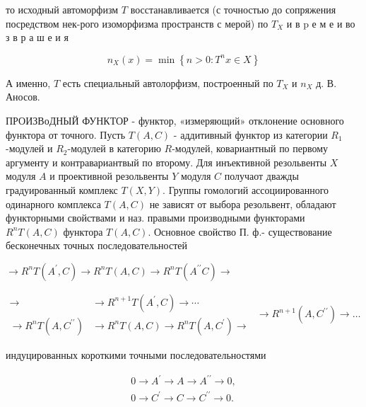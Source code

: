 \documentclass[10pt]{article}
\begin{document}
то исходный автоморфизм $T$ восстанавливается (с точностью до сопряжения посредством нек-рого изоморфизма пространств с мерой) по $T_{X}$ и в $\mathrm{p}$ е м е и во з в р а ш е и я



\[

n_{X}(x)=\min \left\{n>0: T^{n} x \in X\right\}

\]



А именно, $T$ есть специальный автолорфизм, построенный по $T_{X}$ и $n_{X}$ д. В. Аносов.



ПРОИЗВоДНЫЙ ФУНКТОР - функтор, «измеряющий» отклонение основного функтора от точного. Пусть $T(A, C)$ - аддитивный функтор из категории $R_{1}$-модулей и $R_{2}$-модулей в категорию $R$-модулей, ковариантный по первому аргументу и контравариантвый по второму. Для инъективной резольвенты $X$ модуля $A$ и проективной резольвенты $Y$ модуля $C$ получаот дважды градуированный комплекс $T(X, Y)$. Группы гомологий ассоциированного одинарного комплекса $T(A, C)$ не зависят от выбора резольвент, обладают функторными свойствами и наз. правыми производными функторами $R^{n} T(A, C)$ функтора $T(A, C)$. Основное свойство П. ф.- существование бесконечных точных последовательностей



$\longrightarrow R^{n} T\left(A^{\prime}, C\right) \longrightarrow R^{n} T(A, C) \longrightarrow R^{n} T\left(A^{\prime \prime} C\right) \longrightarrow$



$\begin{aligned} \longrightarrow & \longrightarrow R^{n+1} T\left(A^{\prime}, C\right) \longrightarrow \cdots \\ \longrightarrow R^{n} T\left(A, C^{\prime \prime}\right) & \longrightarrow R^{n} T(A, C) \longrightarrow R^{n} T\left(A, C^{\prime}\right) \longrightarrow\end{aligned}$ $\longrightarrow R^{n+1}\left(A, C^{\prime \prime}\right) \longrightarrow \ldots$



индуцированных короткими точными последовательностями



\[

\begin{gathered}

0 \longrightarrow A^{\prime} \longrightarrow A \longrightarrow A^{\prime \prime} \longrightarrow 0, \\

0 \longrightarrow C^{\prime} \longrightarrow C \longrightarrow C^{\prime \prime} \longrightarrow 0 .

\end{gathered}

\]
\end{document}

